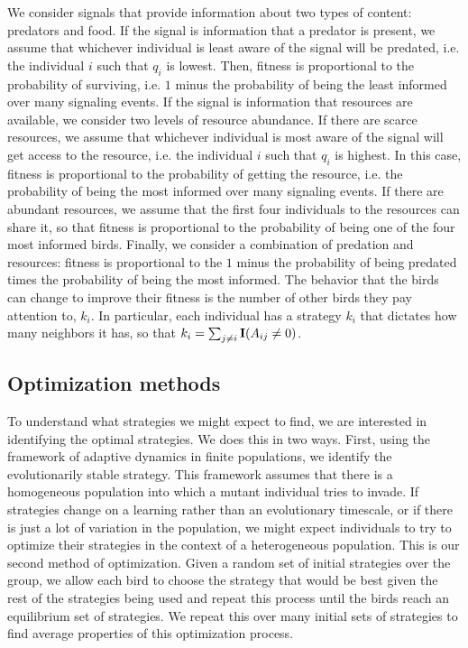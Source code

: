 \documentclass{article}
\begin{document}
We consider signals that provide information about two types of content: predators and food.  If the signal is information that a predator is present, we assume that whichever individual is least aware of the signal will be predated, i.e. the individual $i$ such that $q_i$ is lowest. Then, fitness is proportional to the probability of surviving, i.e. $1$ minus the probability of being the least informed over many signaling events. If the signal is information that resources are available, we consider two levels of resource abundance. If there are scarce resources, we assume that whichever individual is most aware of the signal will get access to the resource, i.e. the individual $i$ such that $q_i$ is highest. In this case, fitness is proportional to the probability of getting the resource, i.e. the probability of being the most informed over many signaling events. If there are abundant resources, we assume that the first four individuals to the resources can share it, so that fitness is proportional to the probability of being one of the four most informed birds. Finally, we consider a combination of predation and resources: fitness is proportional to the $1$ minus the probability of being predated times the probability of being the most informed. The behavior that the birds can change to improve their fitness is the number of other birds they pay attention to, $k_i$. In particular, each individual has a strategy $k_i$ that dictates how many neighbors it has, so that $k_i=\sum_{j\neq i}{\bf I}(A_{ij}\neq 0)$.    

\subsection{Optimization methods }
To understand what strategies we might expect to find, we are interested in identifying the optimal strategies.  We does this in two ways.  First, using the framework of adaptive dynamics in finite populations, we identify the evolutionarily stable strategy.  This framework assumes that there is a homogeneous population into which a mutant individual tries to invade.  If strategies change on a learning rather than an evolutionary timescale, or if there is just a lot of variation in the population, we might expect individuals to try to optimize their strategies in the context of a heterogeneous population.  This is our second method of optimization. Given a random set of initial strategies over the group, we allow each bird to choose the strategy that would be best given the rest of the strategies being used and repeat this process until the birds reach an equilibrium set of strategies. We repeat this over many initial sets of strategies to find average properties of this optimization process.
\end{document}
